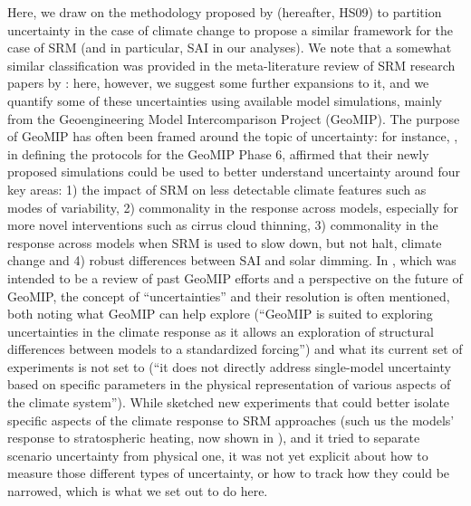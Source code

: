 \documentclass[draft]{agujournal2019}
\begin{document}
Here, we draw on the methodology proposed by  (hereafter, HS09) to partition uncertainty in the case of climate change to propose a similar framework for the case of SRM (and in particular, SAI in our analyses). We note that a somewhat similar classification was provided in the meta-literature review of SRM research papers by : here, however, we suggest some further expansions to it, and we quantify some of these uncertainties using available model simulations, mainly from the Geoengineering Model Intercomparison Project (GeoMIP). The purpose of GeoMIP has often been framed around the topic of uncertainty: for instance, , in defining the protocols for the GeoMIP Phase 6, affirmed that their newly proposed simulations could be used to better understand uncertainty around four key areas: 1) the impact of SRM on less detectable climate features such as modes of variability, 2) commonality in the response across models, especially for more novel interventions such as cirrus cloud thinning, 3) commonality in the response across models when SRM is used to slow down, but not halt, climate change and 4) robust differences between SAI and solar dimming. In , which was intended to be a review of past GeoMIP efforts and a perspective on the future of GeoMIP, the concept of ``uncertainties'' and their resolution is often mentioned, both noting what GeoMIP can help explore (``GeoMIP is suited to exploring uncertainties in the climate response as it allows an exploration of structural differences between models to a standardized forcing'') and what its current set of experiments is not set to (``it does not directly address single-model uncertainty based on specific parameters in the physical representation of various aspects of the climate system''). While  sketched new experiments that could better isolate specific aspects of the climate response to SRM approaches (such us the models' response to stratospheric heating, now shown in ), and it tried to separate scenario uncertainty from physical one, it was not yet explicit about how to measure those different types of uncertainty, or how to track how they could be narrowed, which is what we set out to do here.
\end{document}
